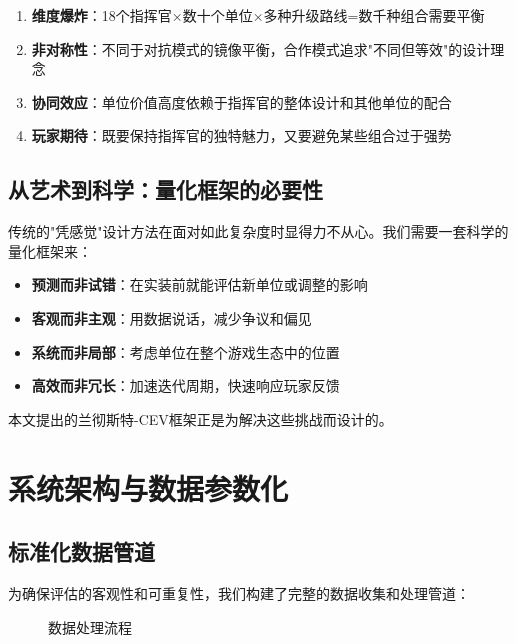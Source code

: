 \documentclass[a4paper,12pt]{article}
\begin{document}
\begin{enumerate}
\item \textbf{维度爆炸}：18个指挥官×数十个单位×多种升级路线=数千种组合需要平衡
\item \textbf{非对称性}：不同于对抗模式的镜像平衡，合作模式追求"不同但等效"的设计理念
\item \textbf{协同效应}：单位价值高度依赖于指挥官的整体设计和其他单位的配合
\item \textbf{玩家期待}：既要保持指挥官的独特魅力，又要避免某些组合过于强势
\end{enumerate}

\subsection{从艺术到科学：量化框架的必要性}
传统的"凭感觉"设计方法在面对如此复杂度时显得力不从心。我们需要一套科学的量化框架来：

\begin{itemize}
\item \textbf{预测而非试错}：在实装前就能评估新单位或调整的影响
\item \textbf{客观而非主观}：用数据说话，减少争议和偏见
\item \textbf{系统而非局部}：考虑单位在整个游戏生态中的位置
\item \textbf{高效而非冗长}：加速迭代周期，快速响应玩家反馈
\end{itemize}

本文提出的兰彻斯特-CEV框架正是为解决这些挑战而设计的。

\section{系统架构与数据参数化}

\subsection{标准化数据管道}
为确保评估的客观性和可重复性，我们构建了完整的数据收集和处理管道：

\begin{figure}[h]
\centering
{}
\caption{数据处理流程}
\end{figure}
\end{document}
